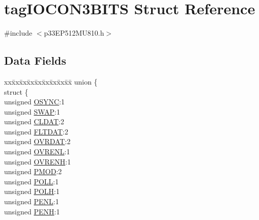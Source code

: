 \hypertarget{structtag_i_o_c_o_n3_b_i_t_s}{}\section{tag\+I\+O\+C\+O\+N3\+B\+I\+TS Struct Reference}
\label{structtag_i_o_c_o_n3_b_i_t_s}


{\ttfamily \#include $<$p33\+E\+P512\+M\+U810.\+h$>$}

\subsection*{Data Fields}
\begin{DoxyCompactItemize}
\item 
\begin{tabbing}
xx\=xx\=xx\=xx\=xx\=xx\=xx\=xx\=xx\=\kill
union \{\\
\>struct \{\\
\>\>unsigned \hyperlink{structtag_i_o_c_o_n3_b_i_t_s_aee7f35d5d04fcd5202b9d569e0d08146}{OSYNC}:1\\
\>\>unsigned \hyperlink{structtag_i_o_c_o_n3_b_i_t_s_a3ed0654ceb192d32e26d2929c9b8dcc2}{SWAP}:1\\
\>\>unsigned \hyperlink{structtag_i_o_c_o_n3_b_i_t_s_a5bcbfaa85bc9c3349fb4e269aa308899}{CLDAT}:2\\
\>\>unsigned \hyperlink{structtag_i_o_c_o_n3_b_i_t_s_afcc1e84f8b5860ae56a567b5de96af73}{FLTDAT}:2\\
\>\>unsigned \hyperlink{structtag_i_o_c_o_n3_b_i_t_s_a6d82e38a9acf634763a64a6876f58d3d}{OVRDAT}:2\\
\>\>unsigned \hyperlink{structtag_i_o_c_o_n3_b_i_t_s_a2e98ef1aea75144311343faf9f705f2d}{OVRENL}:1\\
\>\>unsigned \hyperlink{structtag_i_o_c_o_n3_b_i_t_s_a0e87b6433e91b1b0d550e9419e22b408}{OVRENH}:1\\
\>\>unsigned \hyperlink{structtag_i_o_c_o_n3_b_i_t_s_a4a7369a55430f3368fb601d87d479553}{PMOD}:2\\
\>\>unsigned \hyperlink{structtag_i_o_c_o_n3_b_i_t_s_a269dd0694f25a7b4dd065f3570e09b5e}{POLL}:1\\
\>\>unsigned \hyperlink{structtag_i_o_c_o_n3_b_i_t_s_a21a3881dcaa3ce8bccd5d9906aee8e55}{POLH}:1\\
\>\>unsigned \hyperlink{structtag_i_o_c_o_n3_b_i_t_s_af777eadaa0b86bb09cad6117a36e15aa}{PENL}:1\\
\>\>unsigned \hyperlink{structtag_i_o_c_o_n3_b_i_t_s_a91f04ec56f33e5a2e402f3817a44e91d}{PENH}:1\\

\end{tabbing}
\end{DoxyCompactItemize}

